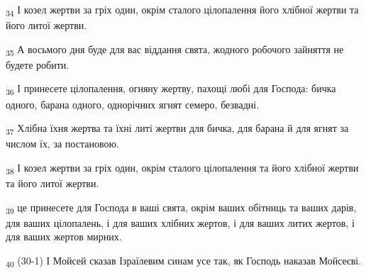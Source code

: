 \begin{tcolorbox}
\textsubscript{34} І козел жертви за гріх один, окрім сталого цілопалення його хлібної жертви та його литої жертви.
\end{tcolorbox}
\begin{tcolorbox}
\textsubscript{35} А восьмого дня буде для вас віддання свята, жодного робочого зайняття не будете робити.
\end{tcolorbox}
\begin{tcolorbox}
\textsubscript{36} І принесете цілопалення, огняну жертву, пахощі любі для Господа: бичка одного, барана одного, однорічних ягнят семеро, безвадні.
\end{tcolorbox}
\begin{tcolorbox}
\textsubscript{37} Хлібна їхня жертва та їхні литі жертви для бичка, для барана й для ягнят за числом їх, за постановою.
\end{tcolorbox}
\begin{tcolorbox}
\textsubscript{38} І козел жертви за гріх один, окрім сталого цілопалення та його хлібної жертви та його литої жертви.
\end{tcolorbox}
\begin{tcolorbox}
\textsubscript{39} це принесете для Господа в ваші свята, окрім ваших обітниць та ваших дарів, для ваших цілопалень, і для ваших хлібних жертов, і для ваших литих жертов, і для ваших жертов мирних.
\end{tcolorbox}
\begin{tcolorbox}
\textsubscript{40} (30-1) І Мойсей сказав Ізраїлевим синам усе так, як Господь наказав Мойсеєві.
\end{tcolorbox}
